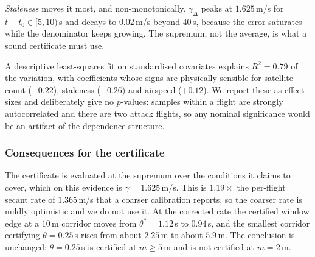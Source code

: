 \emph{Staleness} moves it most, and non-monotonically. $\gamma_{\Delta}$ peaks
at $1.625$\,m/s for $t-t_0\in[5,10)$\,s and decays to $0.02$\,m/s beyond
$40$\,s, because the error saturates while the denominator keeps growing. The
supremum, not the average, is what a sound certificate must use.

A descriptive least-squares fit on standardised covariates explains
$R^{2}=0.79$ of the variation, with coefficients whose signs are physically
sensible for satellite count ($-0.22$), staleness ($-0.26$) and airspeed
($+0.12$). We report these as effect sizes and deliberately give no $p$-values:
samples within a flight are strongly autocorrelated and there are two attack
flights, so any nominal significance would be an artifact of the dependence
structure.

\begin{table}[t]
\centering
\caption{Per-flight rates $\gamma$, the coarse calibration a single scalar per
flight yields. The $2.6\times$ spread across attack type is visible here; the
finer structure needs Table~\ref{tab:gammacamp}. Generated by
.}
\label{tab:gamma}
\small
\renewcommand{\arraystretch}{1.05}

\end{table}

\begin{table}[t]
\centering
\caption{Per-sample distribution of the baseline-corrected rate
$\gamma_{\Delta}$, binned by factor, over $674$ post-onset samples. Counts are
shown because coverage is uneven: airspeed bins above $1$\,m/s are sparse, since
these are hover flights. Generated by .}
\label{tab:gammacamp}
\scriptsize
\renewcommand{\arraystretch}{1.02}

\end{table}

\subsubsection{Consequences for the certificate}
The certificate is evaluated at the supremum over the conditions it claims to
cover, which on this evidence is $\gamma=1.625$\,m/s. This is
$1.19\times$ the per-flight secant rate of $1.365$\,m/s that a coarser
calibration reports, so the coarser rate is mildly optimistic and we do not use
it. At the corrected rate the certified window edge at a $10$\,m corridor moves
from $\theta^{*}=1.12$\,s to $0.94$\,s, and the smallest corridor certifying
$\theta=0.25$\,s rises from about $2.25$\,m to about $5.9$\,m. The conclusion is
unchanged: $\theta=0.25$\,s is certified at $m\ge5$\,m and is not certified at
$m=2$\,m.

